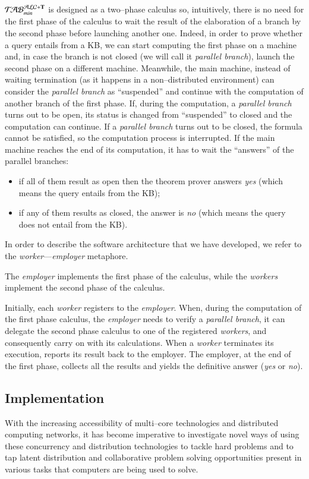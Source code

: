 \documentclass[a4paper, 11pt, oneside]{elsarticle}
\newcommand{\tip}{{\bf T}}
\newcommand{\nuovoc}{\mathrel{{\mathcal{T}\!\mathcal{AB}}}_{min}^{\mathcal{ALC}+\mbox{\scriptsize $\tip$}}}
\begin{document}
$\nuovoc$ is designed as a two--phase calculus so, intuitively, there is no need for the first phase of the calculus to wait the result of the elaboration of a branch by the second phase before launching another one.
Indeed, in order to prove whether a query entails from a KB, we can start computing the first phase on a machine and, in case the branch is not closed (we will call it \emph{parallel branch}), launch the second phase on a different machine.
Meanwhile, the main machine, instead of waiting termination (as it happens in a non--distributed environment) can consider the \emph{parallel branch} as ``suspended'' and continue with the computation of another branch of the first phase.
If, during the computation, a \emph{parallel branch} turns out to be open, its status is changed from ``suspended'' to closed and the computation can continue.
If a \emph{parallel branch} turns out to be closed, the formula cannot be satisfied, so the computation process is interrupted.
If the main machine reaches the end of its computation, it has to wait the ``answers'' of the parallel branches:
\begin{itemize}
\item if all of them result as open then the theorem prover answers \emph{yes} (which means the query entails from the KB);
\item if any of them results as closed, the answer is \emph{no} (which means the query does not entail from the KB).
\end{itemize}

In order to describe the software architecture that we have developed, we refer to the \emph{worker}---\emph{employer} metaphore.

The \emph{employer} implements the first phase of the calculus, while the \emph{workers} implement the second phase of the calculus.

Initially, each \emph{worker} registers to the \emph{employer}.
When, during the computation of the first phase calculus, the \emph{employer} needs to verify a \emph{parallel branch}, it can delegate the second phase calculus to one of the registered \emph{workers}, and consequently carry on with its calculations.
When a \emph{worker} terminates its execution, reports its result back to the employer.
The employer, at the end of the first phase, collects all the results and yields the definitive answer (\emph{yes} or \emph{no}).


\subsection{Implementation}
With the increasing accessibility of multi--core technologies and distributed computing networks, it has become imperative to investigate novel ways of using these concurrency and distribution technologies to tackle hard problems and to tap latent distribution and collaborative problem solving opportunities present in various tasks that computers are being used to solve.
\end{document}
